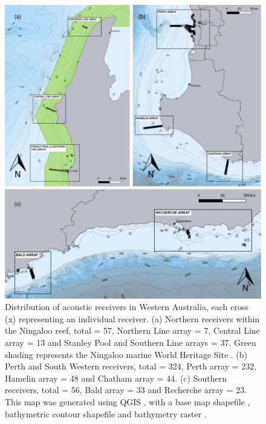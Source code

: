 \documentclass[11pt,a4paper]{article}
\begin{document}
\begin{figure}
	\centering\includegraphics[width=\textwidth]{../Results/arrays_combined2.pdf}
	\caption{Distribution of acoustic receivers in Western Australia, each cross (x) representing an individual receiver. (a) Northern receivers within the Ningaloo reef, total = 57, Northern Line array = 7, Central Line array = 13 and Stanley Pool and Southern Line arrays = 37. Green shading represents the Ningaloo marine World Heritage Site \citep{FlandersMarineInstitute2013}. (b) Perth and South Western receivers, total = 324, Perth array = 232, Hamelin array = 48 and Chatham array = 44. (c) Southern receivers, total = 56, Bald array = 33 and Recherche array = 23. This map was generated using QGIS \citep{QGISDevelopmentTeam2019}, with a base map shapefile \citep{AustralianBureauofStatistics2011}, bathymetric contour shapefile \citep{GEBCOCompilationGroup2019} and bathymetry raster \citep{Whiteway2009}.}
	\label{arrays}
\end{figure}

	
\end{document}
